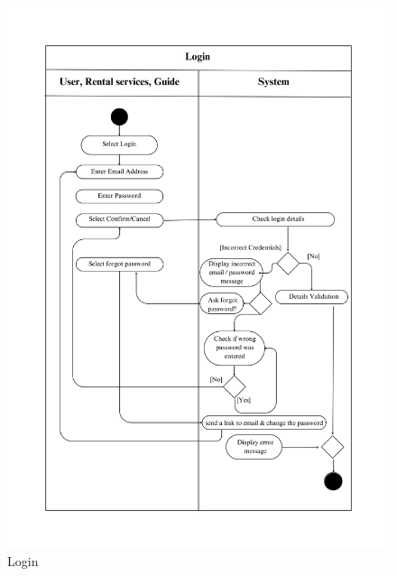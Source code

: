 \begin{figure}[h]
    \centering
    \includegraphics[width=1\textwidth]{Images/Activity Diagrams/2 Login.png}
    \caption{Login}
    \label{fig:activity-login}
\end{figure}

